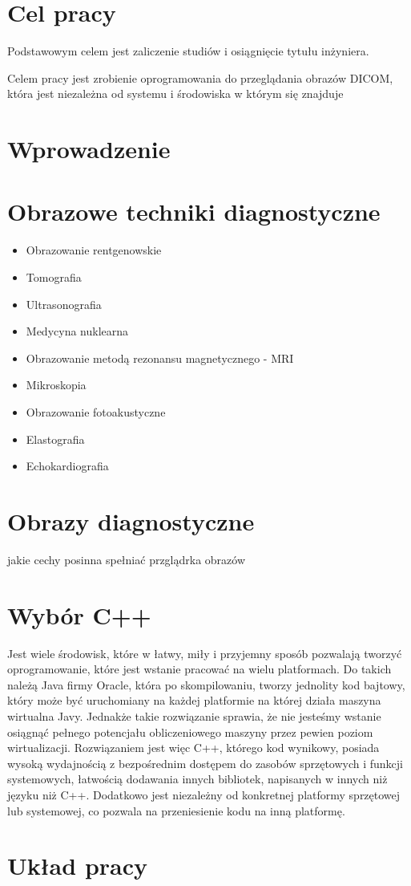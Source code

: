 
\section{Cel pracy}

Podstawowym celem jest zaliczenie studiów i osiągnięcie tytułu inżyniera.

Celem pracy jest zrobienie oprogramowania do przeglądania obrazów DICOM, która jest niezależna od systemu i środowiska w którym się znajduje

\section{Wprowadzenie}

\section{Obrazowe techniki diagnostyczne}

\begin{itemize}
    \item Obrazowanie rentgenowskie
    \item Tomografia
    \item Ultrasonografia
    \item Medycyna nuklearna
    \item Obrazowanie metodą rezonansu magnetycznego - MRI
    \item Mikroskopia
    \item Obrazowanie fotoakustyczne
    \item Elastografia
    \item Echokardiografia
\end{itemize}

\section{Obrazy diagnostyczne}

jakie cechy posinna spełniać przglądrka obrazów

\section{Wybór C++}

Jest wiele środowisk, które w łatwy, miły i przyjemny sposób pozwalają tworzyć oprogramowanie, które jest wstanie pracować na wielu platformach.
Do takich należą Java firmy Oracle, która po skompilowaniu, tworzy jednolity kod bajtowy, który może być uruchomiany na każdej platformie na której działa maszyna wirtualna Javy.
Jednakże takie rozwiązanie sprawia, że nie jesteśmy wstanie osiągnąć pełnego potencjału obliczeniowego maszyny przez pewien poziom wirtualizacji.
Rozwiązaniem jest więc C++, którego kod wynikowy, posiada wysoką wydajnością z bezpośrednim dostępem do zasobów sprzętowych i funkcji systemowych, łatwością dodawania innych bibliotek, napisanych w innych niż języku niż C++.
Dodatkowo jest niezależny od konkretnej platformy sprzętowej lub systemowej, co pozwala na przeniesienie kodu na inną platformę.

\section{Układ pracy}